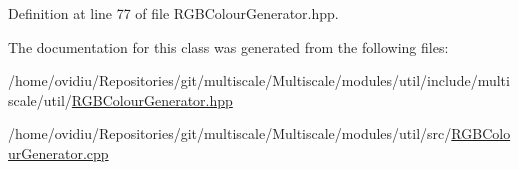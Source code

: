 Definition at line 77 of file R\-G\-B\-Colour\-Generator.\-hpp.



The documentation for this class was generated from the following files\-:\begin{DoxyCompactItemize}
\item 
/home/ovidiu/\-Repositories/git/multiscale/\-Multiscale/modules/util/include/multiscale/util/\hyperlink{RGBColourGenerator_8hpp}{R\-G\-B\-Colour\-Generator.\-hpp}\item 
/home/ovidiu/\-Repositories/git/multiscale/\-Multiscale/modules/util/src/\hyperlink{RGBColourGenerator_8cpp}{R\-G\-B\-Colour\-Generator.\-cpp}\end{DoxyCompactItemize}
